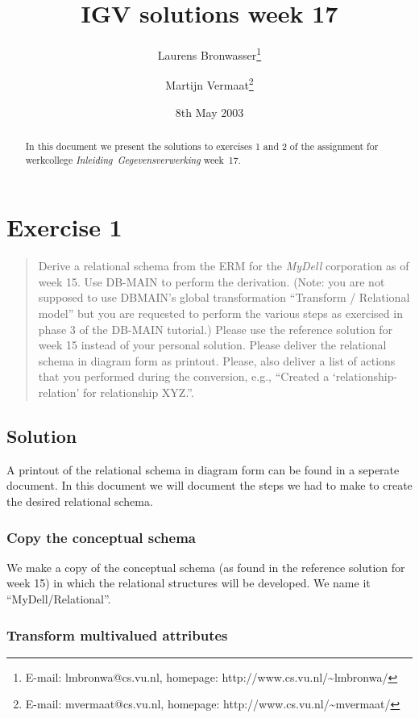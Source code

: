 \documentclass[11pt]{article}
\title{IGV solutions week 17}
\author{
	Laurens Bronwasser\footnote{E-mail: lmbronwa@cs.vu.nl, homepage: http://www.cs.vu.nl/\~{}lmbronwa/}
	\and
	Martijn Vermaat\footnote{E-mail: mvermaat@cs.vu.nl, homepage: http://www.cs.vu.nl/\~{}mvermaat/}
}
\date{8th May 2003}
\begin{document}
\maketitle

\begin{abstract}
In this document we present the solutions to exercises 1 and 2 of the assignment for werkcollege \emph{\mbox{Inleiding Gegevensverwerking}} \mbox{week 17}.
\end{abstract}

\tableofcontents


\newpage

\section{Exercise 1}

\begin{quote}
Derive a relational schema from the ERM for the \emph{MyDell} corporation as of week 15. Use DB-MAIN to perform the derivation. (Note: you are not supposed to use DBMAIN's global transformation ``Transform / Relational model'' but you are requested to perform the various steps as exercised in phase 3 of the DB-MAIN tutorial.) Please use the reference solution for week 15 instead of your personal solution. Please deliver the relational schema in diagram form as printout. Please, also deliver a list of actions that you performed during the conversion, e.g., ``Created a `relationship-relation' for
relationship XYZ.''.
\end{quote}

\subsection*{Solution}

A printout of the relational schema in diagram form can be found in a seperate document. In this document we will document the steps we had to make to create the desired relational schema.


\subsubsection*{Copy the conceptual schema}

We make a copy of the conceptual schema (as found in the reference solution for week 15) in which the relational structures will be developed. We name it ``MyDell/Relational''.


\subsubsection*{Transform multivalued attributes}
\end{document}
